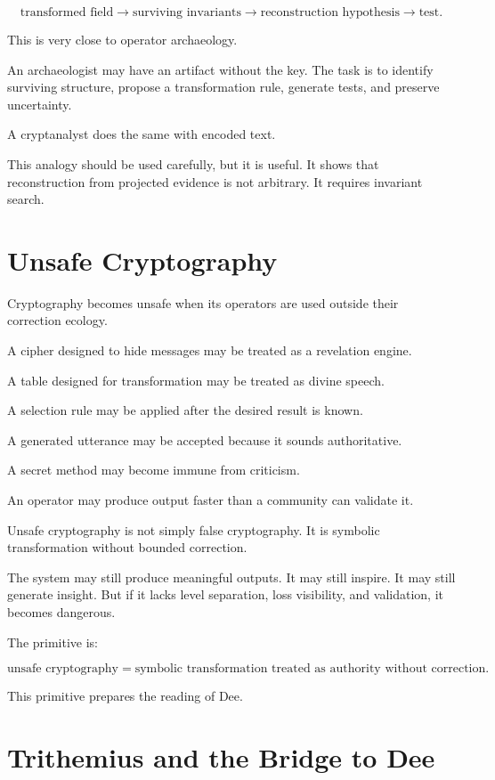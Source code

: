 \documentclass[11pt]{book}
\begin{document}
\[
\text{transformed field}
\rightarrow
\text{surviving invariants}
\rightarrow
\text{reconstruction hypothesis}
\rightarrow
\text{test}.
\]

This is very close to operator archaeology.

An archaeologist may have an artifact without the key. The task is to identify surviving structure, propose a transformation rule, generate tests, and preserve uncertainty.

A cryptanalyst does the same with encoded text.

This analogy should be used carefully, but it is useful. It shows that reconstruction from projected evidence is not arbitrary. It requires invariant search.

\section{Unsafe Cryptography}

Cryptography becomes unsafe when its operators are used outside their correction ecology.

A cipher designed to hide messages may be treated as a revelation engine.

A table designed for transformation may be treated as divine speech.

A selection rule may be applied after the desired result is known.

A generated utterance may be accepted because it sounds authoritative.

A secret method may become immune from criticism.

An operator may produce output faster than a community can validate it.

Unsafe cryptography is not simply false cryptography. It is symbolic transformation without bounded correction.

The system may still produce meaningful outputs. It may still inspire. It may still generate insight. But if it lacks level separation, loss visibility, and validation, it becomes dangerous.

The primitive is:

\[
\text{unsafe cryptography} = \text{symbolic transformation treated as authority without correction}.
\]

This primitive prepares the reading of Dee.

\section{Trithemius and the Bridge to Dee}
\end{document}

